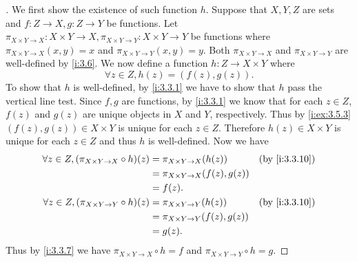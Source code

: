 \begin{proof}[]
  We first show the existence of such function \(h\).
  Suppose that \(X, Y, Z\) are sets and \(f : Z \to X, g : Z \to Y\) be functions.
  Let \(\pi_{X \times Y \to X} : X \times Y \to X, \pi_{X \times Y \to Y} : X \times Y \to Y\) be functions where \(\pi_{X \times Y \to X}(x, y) = x\) and \(\pi_{X \times Y \to Y}(x, y) = y\).
  Both \(\pi_{X \times Y \to X}\) and \(\pi_{X \times Y \to Y}\) are well-defined by \cref{i:3.6}.
  We now define a function \(h : Z \to X \times Y\) where
  \[
    \forall z \in Z, h(z) = (f(z), g(z)).
  \]
  To show that \(h\) is well-defined, by \cref{i:3.3.1} we have to show that \(h\) pass the vertical line test.
  Since \(f, g\) are functions, by \cref{i:3.3.1} we know that for each \(z \in Z\), \(f(z)\) and \(g(z)\) are unique objects in \(X\) and \(Y\), respectively.
  Thus by \cref{i:ex:3.5.3} \((f(z), g(z)) \in X \times Y\) is unique for each \(z \in Z\).
  Therefore \(h(z) \in X \times Y\) is unique for each \(z \in Z\) and thus \(h\) is well-defined.
  Now we have
  \begin{align*}
    \forall z \in Z, (\pi_{X \times Y \to X} \circ h)(z) & = \pi_{X \times Y \to X}(h(z))       &  & \by{i:3.3.10} \\
                                                         & = \pi_{X \times Y \to X}(f(z), g(z))                    \\
                                                         & = f(z).                                                 \\
    \forall z \in Z, (\pi_{X \times Y \to Y} \circ h)(z) & = \pi_{X \times Y \to Y}(h(z))       &  & \by{i:3.3.10} \\
                                                         & = \pi_{X \times Y \to Y}(f(z), g(z))                    \\
                                                         & = g(z).
  \end{align*}
  Thus by \cref{i:3.3.7} we have \(\pi_{X \times Y \to X} \circ h = f\) and \(\pi_{X \times Y \to Y} \circ h = g\).


\end{proof}
